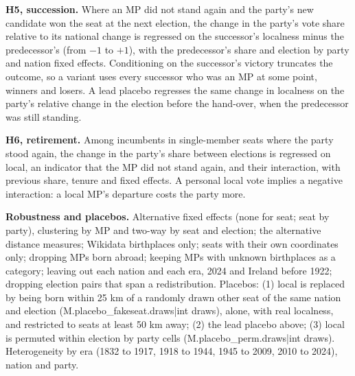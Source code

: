 \documentclass[11pt,a4paper]{article}
\begin{document}
\textbf{H5, succession.} Where an MP did not stand again and the party's new candidate won the seat at the next election, the change in the party's vote share relative to its national change is regressed on the successor's localness minus the predecessor's (from $-1$ to $+1$), with the predecessor's share and election by party and nation fixed effects. Conditioning on the successor's victory truncates the outcome, so a variant uses every successor who was an MP at some point, winners and losers. A lead placebo regresses the same change in localness on the party's relative change in the election before the hand-over, when the predecessor was still standing.

\textbf{H6, retirement.} Among incumbents in single-member seats where the party stood again, the change in the party's share between elections is regressed on local, an indicator that the MP did not stand again, and their interaction, with previous share, tenure and fixed effects. A personal local vote implies a negative interaction: a local MP's departure costs the party more.

\textbf{Robustness and placebos.} Alternative fixed effects (none for seat; seat by party), clustering by MP and two-way by seat and election; the alternative distance measures; Wikidata birthplaces only; seats with their own coordinates only; dropping MPs born abroad; keeping MPs with unknown birthplaces as a category; leaving out each nation and each era, 2024 and Ireland before 1922; dropping election pairs that span a redistribution. Placebos: (1) local is replaced by being born within 25 km of a randomly drawn other seat of the same nation and election ({{M.placebo_fakeseat.draws|int}} draws), alone, with real localness, and restricted to seats at least 50 km away; (2) the lead placebo above; (3) local is permuted within election by party cells ({{M.placebo_perm.draws|int}} draws). Heterogeneity by era (1832 to 1917, 1918 to 1944, 1945 to 2009, 2010 to 2024), nation and party.
\end{document}
